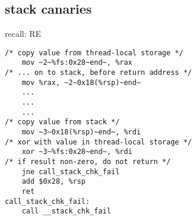 \subsection{stack canaries}


\begin{frame}[fragile,label=reCanary]{recall: RE}
\vspace{-.25cm}
\begin{lstlisting}
/* copy value from thread-local storage */
    mov ~2~%fs:0x28~end~, %rax 
/* ... on to stack, before return address */
    mov %rax, ~2~0x18(%rsp)~end~
    ...
    ...
    ...
/* copy value from stack */
    mov ~3~0x18(%rsp)~end~, %rdi
/* xor with value in thread-local storage */
    xor ~3~%fs:0x28~end~, %rdi
/* if result non-zero, do not return */
    jne call_stack_chk_fail
    add $0x28, %rsp
    ret
call_stack_chk_fail:
    call __stack_chk_fail
\end{lstlisting}
\end{frame}

